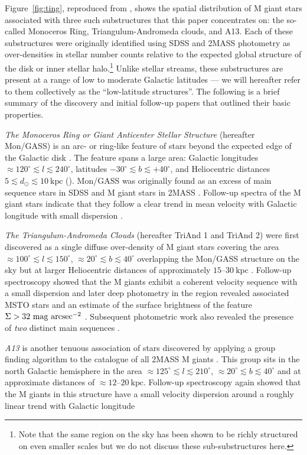 \documentclass[galaxies,article,submit,moreauthors,pdftex,10pt,a4paper]{mdpi}
\newcommand{\kpc}{\mathrm{kpc}}
\begin{document}
Figure~\ref{fig:ting}, reproduced from \cite{li17}, shows the spatial distribution of M giant stars associated with three such substructures that this paper concentrates on: the so-called Monoceros Ring, Triangulum-Andromeda clouds, and A13.
Each of these substructures were originally identified using SDSS and 2MASS photometry as over-densities in stellar number counts relative to the expected global structure of the disk or inner stellar halo.\footnote{Note that the same region on the sky has been shown to be richly structured on even smaller scales\cite{slater14,martin14,deason14} but we do not discuss these sub-substructures here.}
Unlike stellar streams, these substructures are present at a range of low to moderate Galactic latitudes --- we will hereafter refer to them collectively as the ``low-latitude structures''.
The following is a brief  summary of the discovery and initial follow-up papers that outlined their basic properties.
\begin{description}
\item{\it The Monoceros Ring or Giant Anticenter Stellar Structure} (hereafter Mon/GASS) is an arc- or ring-like feature of stars beyond the expected edge of the Galactic disk \cite[assumed to be $\approx 5~\kpc$ beyond the Sun in cylindrical radius ---][]{robin92}.
The feature spans a large area: Galactic longitudes $\approx 120^\circ \lesssim l \lesssim 240^\circ$, latitudes $-30^\circ \lesssim b \lesssim +40^\circ$, and Heliocentric distances $5\lesssim d_\odot \lesssim 10~\kpc$ (\cite{Morganson:2016}).
Mon/GASS was originally found as an excess of main sequence stars in SDSS \cite{yanny03,ibata03} and M giant stars in 2MASS \cite{rochapinto03}.
Follow-up spectra of the M giant stars indicate that they follow a clear trend in mean velocity with Galactic longitude with small dispersion \cite{crane03}.
\item{\it The Triangulum-Andromeda Clouds} (hereafter TriAnd 1 and TriAnd 2) were first discovered as a single diffuse over-density of M giant stars covering the area $\approx 100^\circ \lesssim l \lesssim 150^\circ$, $\approx 20^\circ \lesssim b \lesssim 40^\circ$ overlapping the Mon/GASS structure on the sky but at larger Heliocentric distances of approximately $15$--$30~\kpc$ \cite{rochapinto04}.
Follow-up spectroscopy showed that the M giants exhibit a coherent velocity sequence with a small dispersion \cite{rochapinto04} and later deep photometry in the region revealed associated MSTO stars and an estimate of the surface brightness of the feature $\Sigma > 32~{\rm mag}~{\rm arcsec}^{-2}$ \cite{majewski04}.
Subsequent photometric work also revealed the presence of {\it two} distinct main sequences \cite{martin07}.
\item{\it A13} is another tenuous association of stars discovered by applying a group finding algorithm \cite{sharma09} to the catalogue of all 2MASS M giants \cite{sharma10}.
This group sits in the north Galactic hemisphere in the area $\approx 125^\circ
\lesssim l \lesssim 210^\circ$, $\approx 20^\circ \lesssim b \lesssim 40^\circ$
and at approximate distances of $\approx 12$--$20~\kpc$.
Follow-up spectroscopy again showed that the M giants in this structure have a
small velocity dispersion around a roughly linear trend with Galactic longitude
\cite{li17}
\end{description}
\end{document}
